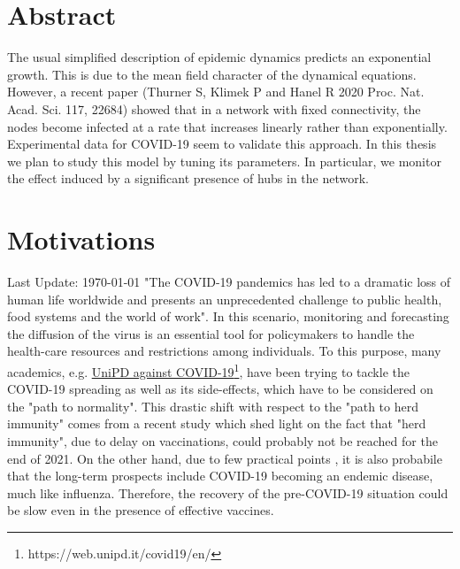 \documentclass[a4paper,10pt,twoside]{book} %
\theoremstyle{definition}
\begin{document}
	


\chapter*{Abstract}
The usual simplified description of epidemic dynamics predicts an exponential growth. This is due to the mean field character of the dynamical equations. However, a recent paper (Thurner S, Klimek P and Hanel R 2020 Proc. Nat. Acad. Sci. 117, 22684) \cite{Thurner::NetBasedExpl} showed
that in a network with fixed connectivity, the nodes become infected at a rate that increases linearly rather than exponentially.
Experimental data for COVID-19 seem to validate this approach. In this thesis we plan to study this model by tuning its parameters.
In particular, we monitor the effect induced by a significant presence of hubs in the network.

\chapter*{Motivations}
Last Update: \today
"The COVID-19 pandemics has led to a dramatic loss of human life worldwide and presents an unprecedented challenge to public health, food systems and the world of work"\cite{Chriscaden::2021_ImpactCOVID19}. In this scenario, monitoring and forecasting the diffusion of the virus is an essential tool for policymakers to handle the health-care resources and restrictions among individuals. To this purpose, many academics, e.g. \href{https://web.unipd.it/covid19/en/}{UniPD against COVID-19}\footnote{https://web.unipd.it/covid19/en/}, have been trying to tackle the COVID-19 spreading as well as its side-effects, which have to be considered on the "path to normality". This drastic shift with respect to the "path to herd immunity" comes from a recent study \cite{GU::2021_SitePathToNormality} which shed light on the fact that "herd immunity", due to delay on vaccinations, could probably not be reached for the end of 2021. On the other hand, due to few practical points \cite{Nature:18.3.2021_NoHerdImmunity}, it is also probabile that the long-term prospects include COVID-19 becoming an endemic disease, much like influenza. 
Therefore, the recovery of the pre-COVID-19 situation could be slow even in the presence of effective vaccines.
\end{document}

